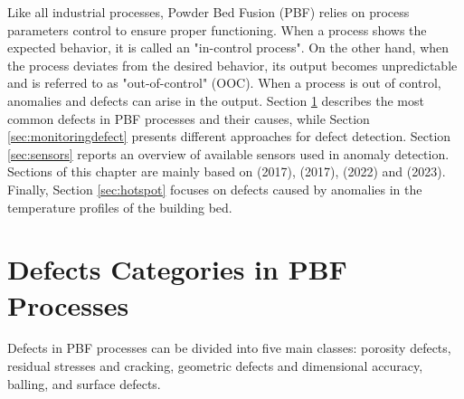 Like all industrial processes, Powder Bed Fusion (PBF) relies on process parameters control to ensure proper functioning. When a process shows the expected behavior, it is called an "in-control process". On the other hand, when the process deviates from the desired behavior, its output becomes unpredictable and is referred to as "out-of-control" (OOC). When a process is out of control, anomalies and defects can arise in the output. Section \ref{sec:defects} describes the most common defects in PBF processes and their causes, while Section \ref{sec:monitoringdefect} presents different approaches for defect detection. Section \ref{sec:sensors} reports an overview of available sensors used in anomaly detection.  Sections of this chapter are mainly based on \citeauthor{grasso_-process_2017} (2017), \citeauthor{grasso_process_2017} (2017), \citeauthor{mostafaei_defects_2022} (2022) and \citeauthor{wu_additively_2023} (2023). Finally, Section \ref{sec:hotspot} focuses on defects caused by anomalies in the temperature profiles of the building bed.

\section{Defects Categories in PBF Processes}
\label{sec:defects}
Defects in PBF processes can be divided into five main classes: porosity defects, residual stresses and cracking, geometric defects and dimensional accuracy, balling, and surface defects.
